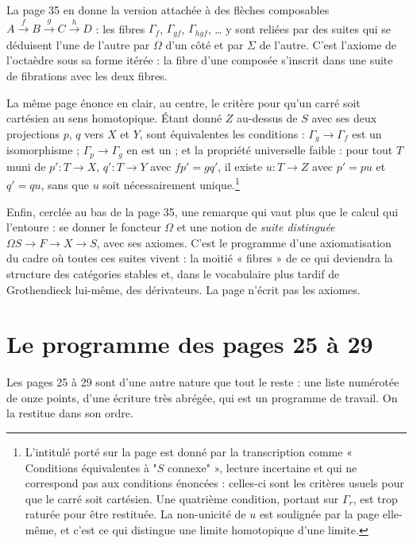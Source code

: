 \documentclass[11pt,a4paper]{article}
\begin{document}
La page 35 en donne la version attachée à des flèches composables $A
\xrightarrow{f} B \xrightarrow{g} C \xrightarrow{h} D$ : les fibres
$\Gamma_{f}$, $\Gamma_{gf}$, $\Gamma_{hgf}$, \ldots{} y sont reliées par des
suites qui se déduisent l'une de l'autre par $\Omega$ d'un côté et par
$\Sigma$ de l'autre. C'est l'axiome de l'octaèdre sous sa forme itérée : la
fibre d'une composée s'inscrit dans une suite de fibrations avec les deux
fibres.

La même page énonce en clair, au centre, le critère pour qu'un carré soit
cartésien au sens homotopique. Étant donné $Z$ au-dessus de $S$ avec ses deux
projections $p$, $q$ vers $X$ et $Y$, sont équivalentes les conditions :
$\Gamma_{g} \to \Gamma_{f}$ est un isomorphisme ; $\Gamma_{p} \to \Gamma_{g}$
en est un ; et la propriété universelle faible : pour tout $T$ muni de $p' : T
\to X$, $q' : T \to Y$ avec $fp' = gq'$, il existe $u : T \to Z$ avec $p' =
pu$ et $q' = qu$, sans que $u$ soit nécessairement
unique.\footnote{L'intitulé porté sur la page est donné par la transcription
comme « Conditions équivalentes à "$S$ connexe" », lecture incertaine et qui
ne correspond pas aux conditions énoncées : celles-ci sont les critères
usuels pour que le carré soit cartésien. Une quatrième condition, portant sur
$\Gamma_{r}$, est trop raturée pour être restituée. La non-unicité de $u$ est
soulignée par la page elle-même, et c'est ce qui distingue une limite
homotopique d'une limite.}

Enfin, cerclée au bas de la page 35, une remarque qui vaut plus que le calcul
qui l'entoure : se donner le foncteur $\Omega$ et une notion de \emph{suite
distinguée} $\Omega S \to F \to X \to S$, avec ses axiomes. C'est le programme
d'une axiomatisation du cadre où toutes ces suites vivent : la moitié
« fibres » de ce qui deviendra la structure des catégories stables et, dans le
vocabulaire plus tardif de Grothendieck lui-même, des dérivateurs. La page
n'écrit pas les axiomes.

\section*{Le programme des pages 25 à 29}

Les pages 25 à 29 sont d'une autre nature que tout le reste : une liste
numérotée de onze points, d'une écriture très abrégée, qui est un programme de
travail. On la restitue dans son ordre.
\end{document}
